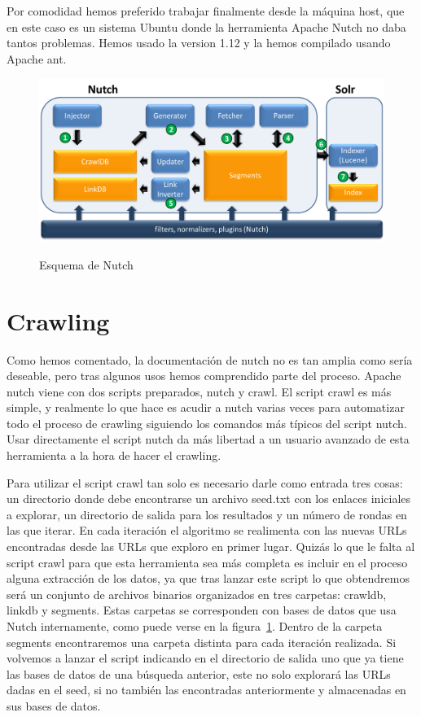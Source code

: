 \documentclass[a4paper]{article}
\begin{document}
Por comodidad hemos preferido trabajar finalmente desde la máquina host, que en este caso es un sistema Ubuntu donde la herramienta Apache Nutch no daba tantos problemas. Hemos usado la version 1.12 y la hemos compilado usando Apache ant.

\begin{figure}
\caption{Esquema de Nutch}
\includegraphics[width=\linewidth]{3RVif}
\label{fig:esquema}
\end{figure}

\section{Crawling}

Como hemos comentado, la documentación de nutch no es tan amplia como sería deseable, pero tras algunos usos hemos comprendido parte del proceso. Apache nutch viene con dos scripts preparados, nutch y crawl. El script crawl es más simple, y realmente lo que hace es acudir a nutch varias veces para automatizar todo el proceso de crawling siguiendo los comandos más típicos del script nutch. Usar directamente el script nutch da más libertad a un usuario avanzado de esta herramienta a la hora de hacer el crawling.

 Para utilizar el script crawl tan solo es necesario darle como entrada tres cosas: un directorio donde debe encontrarse un archivo seed.txt con los enlaces iniciales a explorar, un directorio de salida para los resultados y un número de rondas en las que iterar.  En cada iteración el algoritmo se realimenta con las nuevas URLs encontradas desde las URLs que exploro en primer lugar. Quizás lo que le falta al script crawl para que esta herramienta sea más completa es incluir en el proceso alguna extracción de los datos, ya que tras lanzar este script lo que obtendremos será un conjunto de archivos binarios organizados en tres carpetas: crawldb, linkdb y segments. Estas carpetas se corresponden con bases de datos que usa Nutch internamente, como puede verse en la figura~\ref{fig:esquema}. Dentro de la carpeta segments encontraremos una carpeta distinta para cada iteración realizada. Si volvemos a lanzar el script indicando en el directorio de salida uno que ya tiene las bases de datos de una búsqueda anterior, este no solo explorará las URLs dadas en el seed, si no también las encontradas anteriormente y almacenadas en sus bases de datos.
\end{document}
